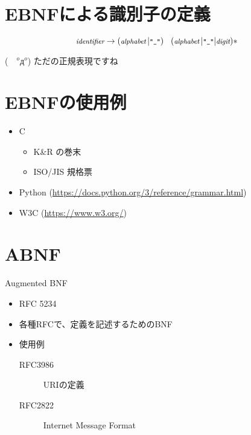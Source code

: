 \documentclass[slide,papersize,fleqn,22pt]{jsarticle}
\begin{document}
\section{EBNFによる識別子の定義}
\[
\footnotesize
\textit{identifier} \rightarrow (\textit{alphabet}\,|\texttt{"\_"})\quad(\textit{alphabet}\,|\texttt{"\_"}|\textit{digit})*
\]

\tiny
(　$^oд^o$) ただの正規表現ですね
\normalsize
\section{EBNFの使用例}
\begin{itemize}
\item C
  \begin{itemize}
  \item K\&R の巻末
  \item ISO/JIS 規格票
  \end{itemize}
\item Python {\tiny(\url{https://docs.python.org/3/reference/grammar.html})}
\item W3C {\tiny(\url{https://www.w3.org/})}
\end{itemize}



\section{ABNF}
Augmented BNF
\begin{itemize}
\item RFC 5234
\item 各種RFCで、定義を記述するためのBNF
\item 使用例
  \begin{description}
  \item[RFC3986] URIの定義
    \item[RFC2822] Internet Message Format
  \end{description}
\end{itemize}
\end{document}
